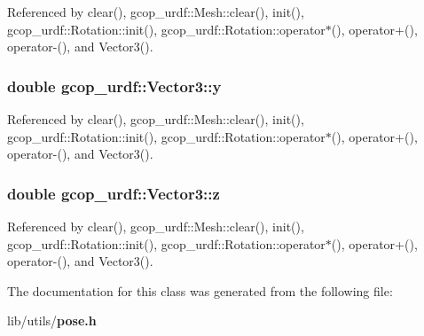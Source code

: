 \-Referenced by clear(), gcop\-\_\-urdf\-::\-Mesh\-::clear(), init(), gcop\-\_\-urdf\-::\-Rotation\-::init(), gcop\-\_\-urdf\-::\-Rotation\-::operator$\ast$(), operator+(), operator-\/(), and \-Vector3().

\subsubsection[{y}]{\setlength{\rightskip}{0pt plus 5cm}double {\bf gcop\-\_\-urdf\-::\-Vector3\-::y}}\label{classgcop__urdf_1_1Vector3_ac53071a2a8cafa88de9e8303d16ad4c6}


\-Referenced by clear(), gcop\-\_\-urdf\-::\-Mesh\-::clear(), init(), gcop\-\_\-urdf\-::\-Rotation\-::init(), gcop\-\_\-urdf\-::\-Rotation\-::operator$\ast$(), operator+(), operator-\/(), and \-Vector3().

\subsubsection[{z}]{\setlength{\rightskip}{0pt plus 5cm}double {\bf gcop\-\_\-urdf\-::\-Vector3\-::z}}\label{classgcop__urdf_1_1Vector3_a3dbb5b0aa3ff6db293bcd5b8ff49ad19}


\-Referenced by clear(), gcop\-\_\-urdf\-::\-Mesh\-::clear(), init(), gcop\-\_\-urdf\-::\-Rotation\-::init(), gcop\-\_\-urdf\-::\-Rotation\-::operator$\ast$(), operator+(), operator-\/(), and \-Vector3().



\-The documentation for this class was generated from the following file\-:\begin{DoxyCompactItemize}
\item 
lib/utils/{\bf pose.\-h}\end{DoxyCompactItemize}

